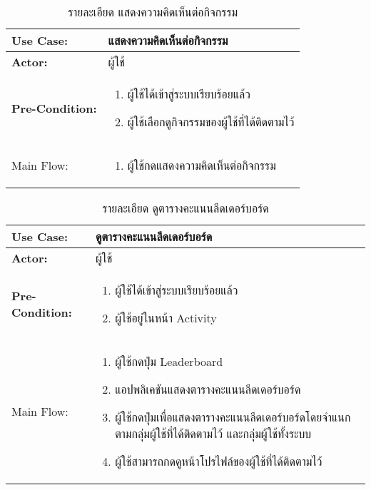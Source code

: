 \begin{table}
    \caption{รายละเอียด แสดงความคิดเห็นต่อกิจกรรม}
    \begin{tabularx}{\textwidth}{ | >{\centering\bf} p{3cm} | X |}
        \hline
        Use Case: & แสดงความคิดเห็นต่อกิจกรรม \\\hline
        Actor: & ผู้ใช้ \\\hline
        Pre-Condition: &
        \begin{enumerate}[table]
            \item ผู้ใช้ได้เข้าสู่ระบบเรียบร้อยแล้ว
            \item ผู้ใช้เลือกดูกิจกรรมของผู้ใช้ที่ได้ติดตามไว้      
        \end{enumerate} \\\hline
        
        Main Flow: & 
        \begin{enumerate}[table]
            \item ผู้ใช้กดแสดงความคิดเห็นต่อกิจกรรม
        \end{enumerate}\\\hline
    \end{tabularx}
\end{table}



\begin{table}
    \caption{รายละเอียด ดูตารางคะแนนลีดเดอร์บอร์ด}
    \begin{tabularx}{\textwidth}{ | >{\centering\bf} p{3cm} | X |}
        \hline
        Use Case: & ดูตารางคะแนนลีดเดอร์บอร์ด \\\hline
        Actor: & ผู้ใช้ \\\hline
        Pre-Condition: &
        \begin{enumerate}[table]
            \item ผู้ใช้ได้เข้าสู่ระบบเรียบร้อยแล้ว
            \item ผู้ใช้อยู่ในหน้า Activity
        \end{enumerate} \\\hline
        
        Main Flow: & 
        \begin{enumerate}[table]
            \item ผู้ใช้กดปุ่ม Leaderboard
            \item แอปพลิเคชันแสดงตารางคะแนนลีดเดอร์บอร์ด
            \item ผู้ใช้กดปุ่มเพื่อแสดงตารางคะแนนลีดเดอร์บอร์ดโดยจำแนกตามกลุ่มผู้ใช้ที่ได้ติดตามไว้ และกลุ่มผู้ใช้ทั้งระบบ
            \item ผู้ใช้สามารถกดดูหน้าโปรไฟล์ของผู้ใช้ที่ได้ติดตามไว้
        \end{enumerate}\\\hline
    \end{tabularx}
\end{table}



